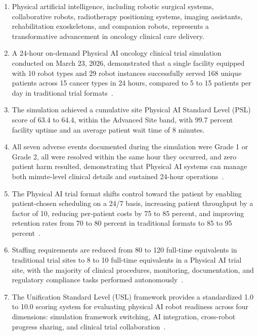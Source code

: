 \documentclass[11pt,letterpaper]{article}
\begin{document}
\begin{enumerate}[label=(\alph*)]
\item Physical artificial intelligence, including robotic surgical systems,
  collaborative robots, radiotherapy positioning systems, imaging assistants,
  rehabilitation exoskeletons, and companion robots, represents a transformative
  advancement in oncology clinical care delivery.

\item A 24-hour on-demand Physical AI oncology clinical trial simulation
  conducted on March 23, 2026, demonstrated that a single facility equipped
  with 10 robot types and 29 robot instances successfully served 168 unique
  patients across 15 cancer types in 24 hours, compared to 5 to 15 patients per
  day in traditional trial formats~\cite{newtrial2026}.

\item The simulation achieved a cumulative site Physical AI Standard Level (PSL)
  score of 63.4 to 64.4, within the Advanced Site band, with 99.7 percent
  facility uptime and an average patient wait time of 8 minutes.

\item All seven adverse events documented during the simulation were Grade 1 or
  Grade 2, all were resolved within the same hour they occurred, and zero
  patient harm resulted, demonstrating that Physical AI systems can manage
  both minute-level clinical details and sustained 24-hour
  operations~\cite{newtrial2026}.

\item The Physical AI trial format shifts control toward the patient by enabling
  patient-chosen scheduling on a 24/7 basis, increasing patient throughput by a
  factor of 10, reducing per-patient costs by 75 to 85 percent, and improving
  retention rates from 70 to 80 percent in traditional formats to 85 to
  95 percent~\cite{formatcomparison2026}.

\item Staffing requirements are reduced from 80 to 120 full-time equivalents in
  traditional trial sites to 8 to 10 full-time equivalents in a Physical AI
  trial site, with the majority of clinical procedures, monitoring,
  documentation, and regulatory compliance tasks performed
  autonomously~\cite{sitespec2026}.

\item The Unification Standard Level (USL) framework provides a standardized
  1.0 to 10.0 scoring system for evaluating physical AI robot readiness across
  four dimensions: simulation framework switching, AI integration, cross-robot
  progress sharing, and clinical trial collaboration~\cite{usl2026}.


\end{enumerate}
\end{document}
